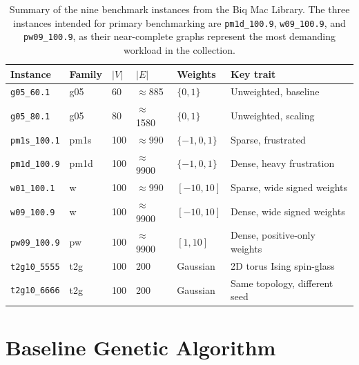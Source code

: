 \documentclass[12pt]{article}
\begin{document}
\begin{table}[H]
    \centering
    \begin{tabularx}{\textwidth}{|l|l|X|X|X|X|}
        \hline
        \textbf{Instance} & \textbf{Family} & $|V|$ & $|E|$ & \textbf{Weights} & \textbf{Key trait} \\
        \hline
        \texttt{g05\_60.1}   & g05  & 60  & $\approx$885   & $\{0,1\}$      & Unweighted, baseline \\
        \hline
        \texttt{g05\_80.1}   & g05  & 80  & $\approx$1580  & $\{0,1\}$      & Unweighted, scaling \\
        \hline
        \texttt{pm1s\_100.1} & pm1s & 100 & $\approx$990   & $\{-1,0,1\}$   & Sparse, frustrated \\
        \hline
        \texttt{pm1d\_100.9} & pm1d & 100 & $\approx$9900  & $\{-1,0,1\}$   & Dense, heavy frustration \\
        \hline
        \texttt{w01\_100.1}  & w    & 100 & $\approx$990   & $[-10,10]$     & Sparse, wide signed weights \\
        \hline
        \texttt{w09\_100.9}  & w    & 100 & $\approx$9900  & $[-10,10]$     & Dense, wide signed weights \\
        \hline
        \texttt{pw09\_100.9} & pw   & 100 & $\approx$9900  & $[1,10]$       & Dense, positive-only weights \\
        \hline
        \texttt{t2g10\_5555} & t2g  & 100 & 200            & Gaussian       & 2D torus Ising spin-glass \\
        \hline
        \texttt{t2g10\_6666} & t2g  & 100 & 200            & Gaussian       & Same topology, different seed \\
        \hline
    \end{tabularx}
    \caption{Summary of the nine benchmark instances from the Biq Mac Library.
             The three instances intended for primary benchmarking are
             \texttt{pm1d\_100.9}, \texttt{w09\_100.9}, and \texttt{pw09\_100.9},
             as their near-complete graphs represent the most demanding workload
             in the collection.}
    \label{tab:instances}
\end{table}

\section{Baseline Genetic Algorithm}
\label{sec:baseline}
\end{document}
